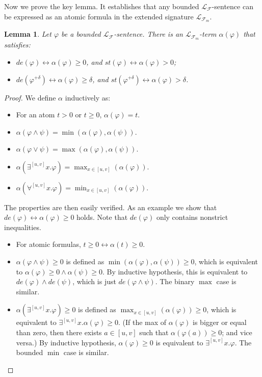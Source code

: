\documentclass[conference]{IEEEtran}
\newtheorem{lemma}[theorem]{Lemma}
\begin{document}
Now we prove the key lemma. It establishes that any bounded $\mathcal{L}_{\mathcal{F}}$-sentence can be expressed as an atomic formula in the extended signature $\mathcal{L}_{\mathcal{F}_m}$. 

\begin{lemma}\label{kk}
Let $\varphi$ be a bounded $\mathcal{L}_{\mathcal{F}}$-sentence. There is an $\mathcal{L}_{\mathcal{F}_m}$-term $\alpha(\varphi)$ that satisfies:
\begin{itemize}
\item $\mathit{de}(\varphi)\leftrightarrow\alpha(\varphi)\geq 0$, and $\mathit{st}(\varphi)\leftrightarrow\alpha(\varphi)> 0$;
\item $\mathit{de}(\varphi^{+\delta})\leftrightarrow\alpha(\varphi)\geq \delta$, and $\mathit{st}(\varphi^{+\delta})\leftrightarrow \alpha(\varphi)>\delta$.   
\end{itemize}
\end{lemma}

\begin{proof}
We define $\alpha$ inductively as:
\begin{itemize}
\item For an atom $t>0$ or $t\geq 0$, $\alpha(\varphi) = t$. 
\item $\alpha(\varphi\wedge\psi) = \min(\alpha(\varphi), \alpha(\psi)).$
\item $\alpha(\varphi\vee\psi) = \max(\alpha(\varphi), \alpha(\psi)).$
\item $\alpha(\exists^{[u,v]}x.\varphi) = \max_{x\in [u,v]}(\alpha(\varphi)).$
\item $\alpha(\forall^{[u,v]}x.\varphi) = \min_{x\in [u,v]}(\alpha(\varphi)). $ 
\end{itemize} 
The properties are then easily verified. As an example we show that $\mathit{de}(\varphi)\leftrightarrow \alpha(\varphi)\geq 0$ holds. Note that $\mathit{de(\varphi)}$ only contains nonstrict inequalities.  
\begin{itemize}
\item For atomic formulas, $t\geq 0 \leftrightarrow \alpha(t)\geq 0$.
\item $\alpha(\varphi\wedge \psi)\geq 0$ is defined as $\min(\alpha(\varphi),\alpha(\psi))\geq 0$, which is equivalent to $\alpha(\varphi)\geq 0 \wedge \alpha(\psi)\geq 0$. By inductive hypothesis, this is equivalent to $\mathit{de}(\varphi)\wedge\mathit{de}(\psi)$, which is just $\mathit{de}(\varphi\wedge\psi)$. The binary $\max$ case is similar. 
\item $\alpha(\exists^{[u,v]} x.\varphi)\geq 0$ is defined as $\max_{x\in [u,v]}(\alpha(\varphi))\geq 0$, which is equivalent to $\exists^{[u,v]}x. \alpha(\varphi)\geq 0$. (If the max of $\alpha(\varphi)$ is bigger or equal than zero, then there exists $a\in [u,v]$ such that $\alpha(\varphi(a))\geq 0$; and vice versa.) By inductive hypothesis, $\alpha(\varphi)\geq 0$ is equivalent to $\exists^{[u,v]}x. \varphi$. The bounded $\min$ case is similar. 
\end{itemize}
\end{proof}
\end{document}
